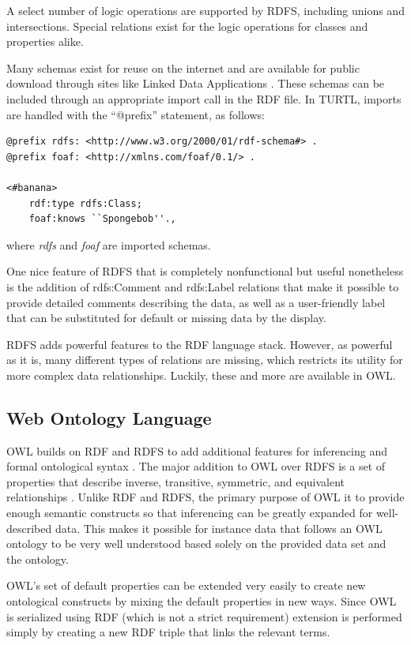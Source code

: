 A select number of logic operations are supported by RDFS, including unions and
intersections. Special relations exist for the logic operations for classes and
properties alike.

Many schemas exist for reuse on the internet and are available for
public download through sites like Linked Data Applications
\cite{noauthor_linked_nodate-1}. These schemas can be included through an
appropriate import call in the RDF file. In TURTL, imports are handled with the ``@prefix''
statement, as follows:
\begin{lstlisting}[language=TURTL]
@prefix rdfs: <http://www.w3.org/2000/01/rdf-schema#> .
@prefix foaf: <http://xmlns.com/foaf/0.1/> .

<#banana>
    rdf:type rdfs:Class;
    foaf:knows ``Spongebob''.,
\end{lstlisting}
where \textit{rdfs} and \textit{foaf} are imported schemas.

One nice feature of RDFS that is completely nonfunctional but useful
nonetheless is the addition of rdfs:Comment and rdfs:Label relations that make
it possible to provide detailed comments describing the data, as well as a
user-friendly label that can be substituted for default or missing data by the
display.

RDFS adds powerful features to the RDF language stack. However, as powerful as
it is, many different types of relations are missing, which restricts its
utility for more complex data relationships. Luckily, these and more are
available in OWL.

\subsection{Web Ontology Language}

OWL builds on RDF and RDFS to add additional
features for inferencing and formal ontological syntax \cite{
noauthor_owl_nodate}. The major addition to OWL over RDFS is a set of
properties that describe inverse, transitive, symmetric, and equivalent relationships
\cite{allemang_semantic_2008}. Unlike RDF and RDFS, the primary purpose of OWL
it to provide enough semantic constructs so that inferencing can be greatly
expanded for well-described data. This makes it possible for instance data that
follows an OWL ontology to be very well understood based solely on the provided
data set and the ontology.

OWL's set of default properties can be extended very easily to create new
ontological constructs by mixing the default properties in new ways. Since OWL
is serialized using RDF (which is not a strict requirement) extension is
performed simply by creating a new RDF triple that links the relevant terms.

